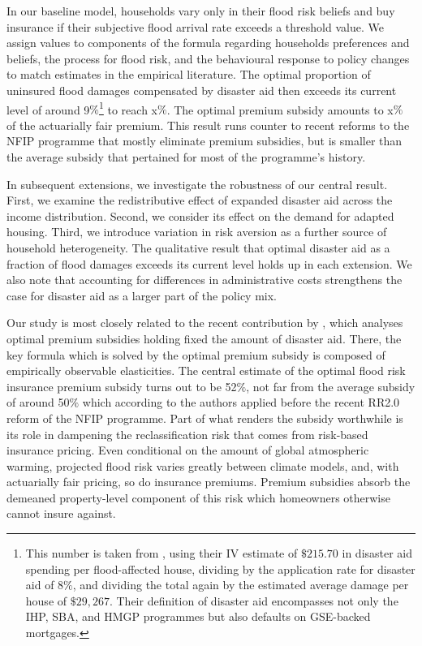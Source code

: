\documentclass[12pt]{article}
\begin{document}
In our baseline model, households vary only in their flood risk beliefs and buy insurance if their subjective flood arrival rate exceeds a threshold value. We assign values to components of the formula regarding households preferences and beliefs, the process for flood risk, and the behavioural response to policy changes to match estimates in the empirical literature. The optimal proportion of uninsured flood damages compensated by disaster aid then exceeds its current level of around 9$\%$\footnote{This number is taken from \cite{gruber2026optimal}, using their IV estimate of $\$215.70$ in disaster aid spending per flood-affected house, dividing by the application rate for disaster aid of $8\%$, and dividing the total again by the estimated average damage per house of $\$29,267$. Their definition of disaster aid encompasses not only the IHP, SBA, and HMGP programmes but also defaults on GSE-backed mortgages.} to reach x$\%$. The optimal premium subsidy amounts to x$\%$ of the actuarially fair premium. This result runs counter to recent reforms to the NFIP programme that mostly eliminate premium subsidies, but is smaller than the average subsidy that pertained for most of the programme's history.   

In subsequent extensions, we investigate the robustness of our central result. First, we examine the redistributive effect of expanded disaster aid across the income distribution. Second, we consider its effect on the demand for adapted housing. Third, we introduce variation in risk aversion as a further source of household heterogeneity. The qualitative result that optimal disaster aid as a fraction of flood damages exceeds its current level holds up in each extension. We also note that accounting for differences in administrative costs strengthens the case for disaster aid as a larger part of the policy mix.     

Our study is most closely related to the recent contribution by \cite{gruber2026optimal}, which analyses optimal premium subsidies holding fixed the amount of disaster aid. There, the key formula which is solved by the optimal premium subsidy is composed of empirically observable elasticities. The central estimate of the optimal flood risk insurance premium subsidy turns out to be 52$\%$, not far from the average subsidy of around 50$\%$ which according to the authors applied before the recent RR2.0 reform of the NFIP programme. Part of what renders the subsidy worthwhile is its role in dampening the reclassification risk that comes from risk-based insurance pricing. Even conditional on the amount of global atmospheric warming, projected flood risk varies greatly between climate models, and, with actuarially fair pricing, so do insurance premiums. Premium subsidies absorb the demeaned property-level component of this risk which homeowners otherwise cannot insure against.
\end{document}
